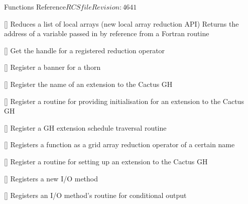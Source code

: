 \begin{cactuspart}{ Functions Reference}{$RCSfile$}{$Revision: 4641 $}
\begin{Lentry}
\item[\code{CCTK\_ReduceLocalArrays}] [\pageref{CCTK-ReduceLocalArrays}]
  Reduces a list of local arrays (new local array reduction API)
  Returns the address of a variable passed in by reference
  from a Fortran routine



\item[\code{CCTK\_ReductionHandle}] [\pageref{CCTK-ReductionHandle}]
  Get the handle for a registered reduction operator

\item[\code{CCTK\_RegisterBanner}] [\pageref{CCTK-RegisterBanner}]
  Register a banner for a thorn

\item[\code{CCTK\_RegisterGHExtension}]
  [\pageref{CCTK-RegisterGHExtension}]
  Register the name of an extension to the Cactus GH

\item[\code{CCTK\_RegisterGHExtensionInitGH}]
  [\pageref{CCTK-RegisterGHExtensionInitGH}]
  Register a routine for providing initialisation for an extension to
  the Cactus GH

\item[\code{CCTK\_RegisterGHExtensionScheduleTraverseGH}]
  [\pageref{CCTK-RegisterGHExtensionScheduleTraverseGH}]
  Register a GH extension schedule traversal routine

\item[\code{CCTK\_RegisterGridArrayReductionOperator}] [\pageref{CCTK-RegisterGridArrayReductionOperator}]
  Registers a function as a grid array reduction operator of a certain name

\item[\code{CCTK\_RegisterGHExtensionSetupGH}]
  [\pageref{CCTK-RegisterGHExtensionSetupGH}]
  Register a routine for setting up an extension to the Cactus GH

\item[\code{CCTK\_RegisterIOMethod}]
  [\pageref{CCTK-RegisterIOMethod}]
  Registers a new I/O method

\item[\code{CCTK\_RegisterIOMethodOutputGH}]
  [\pageref{CCTK-RegisterIOMethodOutputGH}]
  Registers an I/O method's routine for conditional output


\end{Lentry}
\end{cactuspart}
